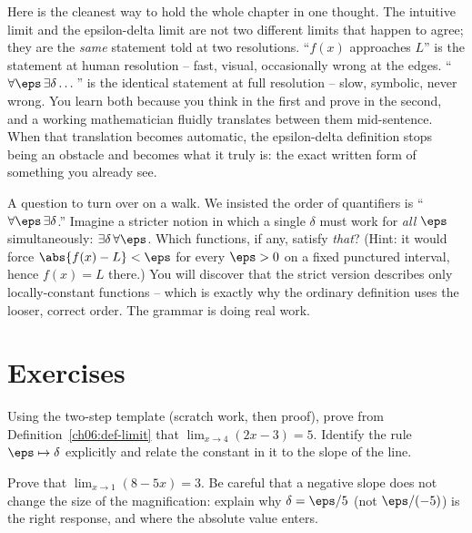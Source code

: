 \begin{happeningbox}
Here is the cleanest way to hold the whole chapter in one thought. The
intuitive limit and the epsilon-delta limit are not two different limits that
happen to agree; they are the \emph{same} statement told at two resolutions. ``$f(x)$
approaches $L$'' is the statement at human resolution -- fast, visual,
occasionally wrong at the edges. ``$\forall\eps\,\exists\delta\dots$'' is the
identical statement at full resolution -- slow, symbolic, never wrong. You learn
both because you think in the first and prove in the second, and a working
mathematician fluidly translates between them mid-sentence. When that
translation becomes automatic, the epsilon-delta definition stops being an
obstacle and becomes what it truly is: the exact written form of something you
already see.
\end{happeningbox}

\begin{walkbox}
A question to turn over on a walk. We insisted the order of quantifiers is
``$\forall\eps\,\exists\delta$.'' Imagine a stricter notion in which a single
$\delta$ must work for \emph{all} $\eps$ simultaneously: $\exists\delta\,
\forall\eps$. Which functions, if any, satisfy \emph{that}? (Hint: it would force
$\abs{f(x)-L}<\eps$ for every $\eps>0$ on a fixed punctured interval, hence
$f(x)=L$ there.) You will discover that the strict version describes only
locally-constant functions -- which is exactly why the ordinary definition uses
the looser, correct order. The grammar is doing real work.
\end{walkbox}

\section{Exercises}
\label{ch06:exercises}

\begin{exercise}
Using the two-step template (scratch work, then proof), prove from
Definition~\ref{ch06:def-limit} that $\displaystyle\lim_{x\to 4}(2x-3)=5$.
Identify the rule $\eps\mapsto\delta$ explicitly and relate the constant in it to
the slope of the line.
\end{exercise}

\begin{exercise}
Prove that $\displaystyle\lim_{x\to 1}(8-5x)=3$. Be careful that a negative slope
does not change the size of the magnification: explain why $\delta=\eps/5$ (not
$\eps/(-5)$) is the right response, and where the absolute value enters.
\end{exercise}

